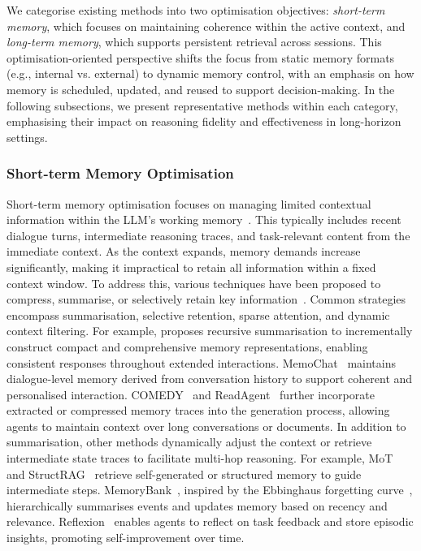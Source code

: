 \documentclass[]{selfevolagent}
\theoremstyle{plain}
\theoremstyle{definition}
\theoremstyle{remark}
\begin{document}
We categorise existing methods into two optimisation objectives: \textit{short-term memory}, which focuses on maintaining coherence within the active context, and \textit{long-term memory}, which supports persistent retrieval across sessions. This optimisation-oriented perspective shifts the focus from static memory formats (e.g., internal vs. external) to dynamic memory control, with an emphasis on how memory is scheduled, updated, and reused to support decision-making. In the following subsections, we present representative methods within each category, emphasising their impact on reasoning fidelity and effectiveness in long-horizon settings.

\subsubsection{Short-term Memory Optimisation}
Short-term memory optimisation focuses on managing limited contextual information within the LLM’s working memory~\citep{liu2023lostmiddlelanguagemodels}. This typically includes recent dialogue turns, intermediate reasoning traces, and task-relevant content from the immediate context. As the context expands, memory demands increase significantly, making it impractical to retain all information within a fixed context window. To address this, various techniques have been proposed to compress, summarise, or selectively retain key information~\citep{zhang2024survey, wang2025recursivelysummarizingenableslongterm}. Common strategies encompass summarisation, selective retention, sparse attention, and dynamic context filtering. For example, \cite{wang2025recursivelysummarizingenableslongterm} proposes recursive summarisation to incrementally construct compact and comprehensive memory representations, enabling consistent responses throughout extended interactions. MemoChat~\citep{lu2023memochattuningllmsuse} maintains dialogue-level memory derived from conversation history to support coherent and personalised interaction. COMEDY~\citep{chen2024compressimpressunleashingpotential} and ReadAgent~\citep{lee2024humaninspiredreadingagentgist} further incorporate extracted or compressed memory traces into the generation process, allowing agents to maintain context over long conversations or documents. In addition to summarisation, other methods dynamically adjust the context or retrieve intermediate state traces to facilitate multi-hop reasoning. For example, MoT~\citep{li2023motmemoryofthoughtenableschatgpt} and StructRAG~\citep{li2024structragboostingknowledgeintensive} retrieve self-generated or structured memory to guide intermediate steps. MemoryBank~\citep{zhong2023memorybankenhancinglargelanguage}, inspired by the Ebbinghaus forgetting curve~\citep{murre2015replication}, hierarchically summarises events and updates memory based on recency and relevance. Reflexion~\citep{shinn2023reflexionlanguageagentsverbal} enables agents to reflect on task feedback and store episodic insights, promoting self-improvement over time. 
\end{document}
